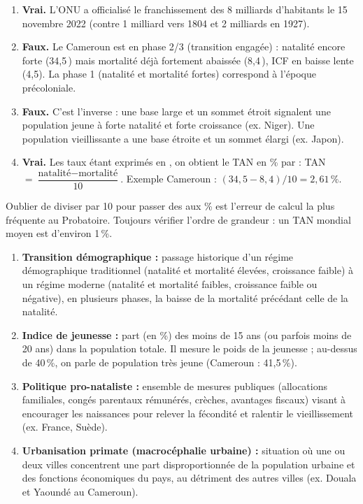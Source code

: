 \documentclass[11pt]{article}
\newcommand{\cle}[1]{{\popxbold\color{popdark}#1}}
\begin{document}
\begin{corrige}
\begin{enumerate}
    \item \textbf{Vrai.} L'ONU a officialisé le franchissement des 8 milliards d'habitants le 15 novembre 2022 (contre 1 milliard vers 1804 et 2 milliards en 1927).
    \item \textbf{Faux.} Le Cameroun est en \cle{phase 2/3} (transition engagée) : natalité encore forte (34,5\,\textperthousand) mais mortalité déjà fortement abaissée (8,4\,\textperthousand), ICF en baisse lente (4,5). La phase 1 (natalité et mortalité fortes) correspond à l'époque précoloniale.
    \item \textbf{Faux.} C'est l'inverse : une base large et un sommet étroit signalent une population \cle{jeune} à forte natalité et forte croissance (ex. Niger). Une population vieillissante a une base étroite et un sommet élargi (ex. Japon).
    \item \textbf{Vrai.} Les taux étant exprimés en \textperthousand, on obtient le TAN en \% par : TAN $= \dfrac{\text{natalité} - \text{mortalité}}{10}$. Exemple Cameroun : $(34,5 - 8,4)/10 = 2,61\,\%$.
\end{enumerate}
\end{corrige}

\begin{attention}
Oublier de diviser par 10 pour passer des \textperthousand aux \% est l'erreur de calcul la plus fréquente au Probatoire. Toujours vérifier l'ordre de grandeur : un TAN mondial moyen est d'environ 1\,\%.
\end{attention}

\begin{corrige}
\begin{enumerate}
    \item \textbf{Transition démographique :} passage historique d'un régime démographique traditionnel (natalité et mortalité élevées, croissance faible) à un régime moderne (natalité et mortalité faibles, croissance faible ou négative), en plusieurs phases, la baisse de la mortalité précédant celle de la natalité.
    \item \textbf{Indice de jeunesse :} part (en \%) des moins de 15 ans (ou parfois moins de 20 ans) dans la population totale. Il mesure le poids de la jeunesse ; au-dessus de 40\,\%, on parle de population très jeune (Cameroun : 41,5\,\%).
    \item \textbf{Politique pro-nataliste :} ensemble de mesures publiques (allocations familiales, congés parentaux rémunérés, crèches, avantages fiscaux) visant à encourager les naissances pour relever la fécondité et ralentir le vieillissement (ex. France, Suède).
    \item \textbf{Urbanisation primate (macrocéphalie urbaine) :} situation où une ou deux villes concentrent une part disproportionnée de la population urbaine et des fonctions économiques du pays, au détriment des autres villes (ex. Douala et Yaoundé au Cameroun).
\end{enumerate}
\end{corrige}
\end{document}
